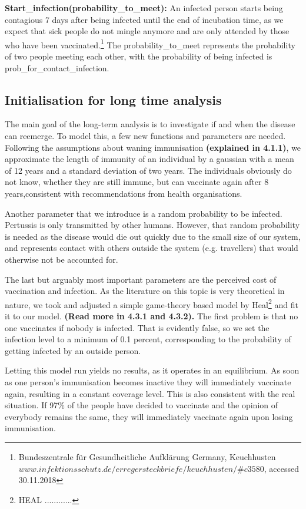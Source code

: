 \documentclass[11pt]{article}
\begin{document}
\textbf{Start\_infection(probability\_to\_meet):} An infected person starts being contagious 7 days after being infected until the end of incubation time, as we expect that sick people do not mingle anymore and are only attended by those who have been vaccinated.\footnote{Bundeszentrale für Gesundheitliche Aufklärung Germany, Keuchhusten \break
$www.infektionsschutz.de/erregersteckbriefe/keuchhusten/\#c3580$, accessed 30.11.2018} The probability\_to\_meet represents the probability of two people meeting each other, with the probability of being infected is prob\_for\_contact\_infection.
\vspace{14px}


\subsection{Initialisation for long time analysis}
The main goal of the long-term analysis is to investigate if and when the disease can reemerge. To model this, a few new functions and parameters are needed. Following the assumptions about waning immunisation \textbf{(explained in 4.1.1)}, we approximate the length of immunity of an individual by a gaussian with a mean of 12 years and a standard deviation of two years. The individuals obviously do not know, whether they are still immune, but can vaccinate again after 8 years,consistent with recommendations from health organisations. 

Another parameter that we introduce is a random probability to be infected. Pertussis is only transmitted by other humans. However, that random probability is needed as the disease would die out quickly due to the small size of our system, and represents contact with others outside the system (e.g. travellers) that would otherwise not be accounted for. 

The last but arguably most important parameters are the perceived cost of vaccination and infection. As the literature on this topic is very theoretical in nature, we took and adjusted a simple game-theory based model by Heal\footnote{HEAL ............} and fit it to our model. \textbf{(Read more in 4.3.1 and 4.3.2).} The first problem is that no one vaccinates if nobody is infected. That is evidently false, so we set the infection level to a minimum of 0.1 percent, corresponding to the probability of getting infected by an outside person.
\vspace{14px}


Letting this model run yields no results, as it operates in an equilibrium. As soon as one person’s immunisation becomes inactive they will immediately vaccinate again, resulting in a constant coverage level. This is also consistent with the real situation. If 97\% of the people have decided to vaccinate and the opinion of everybody remains the same, they will immediately vaccinate again upon losing immunisation.
\vspace{14px}
\end{document}
